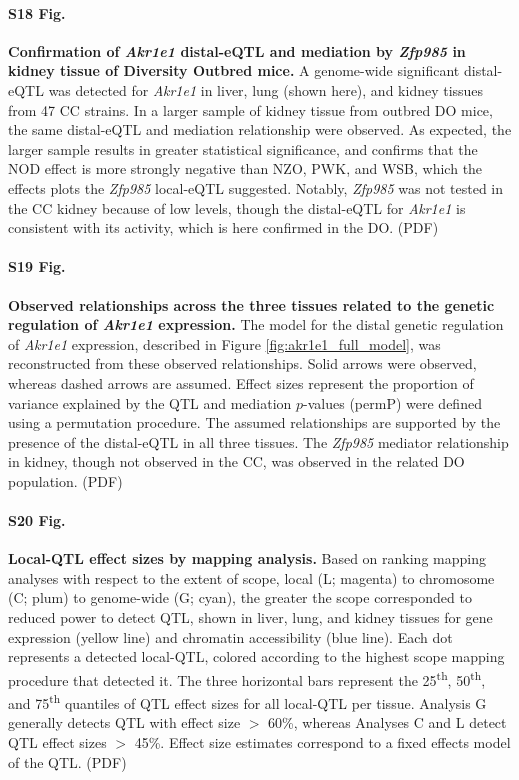 \documentclass[10pt,letterpaper]{article}
\begin{document}
\paragraph*{S18 Fig.}
\label{S_do_akr1e1}
{\bf Confirmation of \textit{Akr1e1} distal-eQTL and mediation by \textit{Zfp985} in kidney tissue of Diversity Outbred mice.}
A genome-wide significant distal-eQTL was detected for \textit{Akr1e1} in liver, lung (shown here), and kidney tissues from 47 CC strains. In a larger sample of kidney tissue from outbred DO mice, the same distal-eQTL and mediation relationship were observed. As expected, the larger sample results in greater statistical significance, and confirms that the NOD effect is more strongly negative than NZO, PWK, and WSB, which the effects plots the \textit{Zfp985} local-eQTL suggested. Notably, \textit{Zfp985} was not tested in the CC kidney because of low levels, though the distal-eQTL for \textit{Akr1e1} is consistent with its activity, which is here confirmed in the DO. (PDF)

\paragraph*{S19 Fig.}
\label{S_akr1e1_relationships}
{\bf Observed relationships across the three tissues related to the genetic regulation of \textit{Akr1e1} expression.}
The model for the distal genetic regulation of \textit{Akr1e1} expression, described in Figure \ref{fig:akr1e1_full_model}, was reconstructed from these observed relationships. Solid arrows were observed, whereas dashed arrows are assumed. Effect sizes represent the proportion of variance explained by the QTL and mediation $p$-values (permP) were defined using a permutation procedure. The assumed relationships are supported by the presence of the distal-eQTL in all three tissues. The \textit{Zfp985} mediator relationship in kidney, though not observed in the CC, was observed in the related DO population. (PDF)

\paragraph*{S20 Fig.}
\label{S_qtl_effect_sizes_by_method}
{\bf Local-QTL effect sizes by mapping analysis.}
Based on ranking mapping analyses with respect to the extent of scope, local (L; magenta) to chromosome (C; plum) to genome-wide (G; cyan), the greater the scope corresponded to reduced power to detect QTL, shown in liver, lung, and kidney tissues for gene expression (yellow line) and chromatin accessibility (blue line). Each dot represents a detected local-QTL, colored according to the highest scope mapping procedure that detected it. The three horizontal bars represent the 25\textsuperscript{th}, 50\textsuperscript{th}, and 75\textsuperscript{th} quantiles of QTL effect sizes for all local-QTL per tissue. Analysis G generally detects QTL with effect size $>$ 60\%, whereas Analyses C and L detect QTL effect sizes $>$ 45\%. Effect size estimates correspond to a fixed effects model of the QTL. (PDF)
\end{document}

